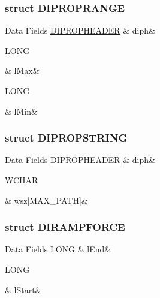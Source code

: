 \subsubsection{struct D\-I\-P\-R\-O\-P\-R\-A\-N\-G\-E}
\begin{DoxyFields}{Data Fields}
\hypertarget{a00003_a7010842dfbdaa5bb4357503558202537}{\hyperlink{a00003_d0/d61/a00100}{D\-I\-P\-R\-O\-P\-H\-E\-A\-D\-E\-R}}\label{a00003_a7010842dfbdaa5bb4357503558202537}
&
diph&
\\
\hline

\hypertarget{a00003_a373c13e8e98fe384db9be83136ac5c04}{L\-O\-N\-G}\label{a00003_a373c13e8e98fe384db9be83136ac5c04}
&
l\-Max&
\\
\hline

\hypertarget{a00003_a10b99c2e16e80d932b8c67ff9239ecb9}{L\-O\-N\-G}\label{a00003_a10b99c2e16e80d932b8c67ff9239ecb9}
&
l\-Min&
\\
\hline

\end{DoxyFields}
\label{d5/d1e/a00103}
\hypertarget{a00003_d5/d1e/a00103}{}
\subsubsection{struct D\-I\-P\-R\-O\-P\-S\-T\-R\-I\-N\-G}
\begin{DoxyFields}{Data Fields}
\hypertarget{a00003_a7010842dfbdaa5bb4357503558202537}{\hyperlink{a00003_d0/d61/a00100}{D\-I\-P\-R\-O\-P\-H\-E\-A\-D\-E\-R}}\label{a00003_a7010842dfbdaa5bb4357503558202537}
&
diph&
\\
\hline

\hypertarget{a00003_a395f03f595de3a960a2d670a88a2beb4}{W\-C\-H\-A\-R}\label{a00003_a395f03f595de3a960a2d670a88a2beb4}
&
wsz\mbox{[}M\-A\-X\-\_\-\-P\-A\-T\-H\mbox{]}&
\\
\hline

\end{DoxyFields}
\label{d0/dc2/a00104}
\hypertarget{a00003_d0/dc2/a00104}{}
\subsubsection{struct D\-I\-R\-A\-M\-P\-F\-O\-R\-C\-E}
\begin{DoxyFields}{Data Fields}
\hypertarget{a00003_a335737bf1197ceadd1516dd615939362}{L\-O\-N\-G}\label{a00003_a335737bf1197ceadd1516dd615939362}
&
l\-End&
\\
\hline

\hypertarget{a00003_ad6e5e5b134f022d8552a40e21617fe37}{L\-O\-N\-G}\label{a00003_ad6e5e5b134f022d8552a40e21617fe37}
&
l\-Start&
\\
\hline

\end{DoxyFields}


